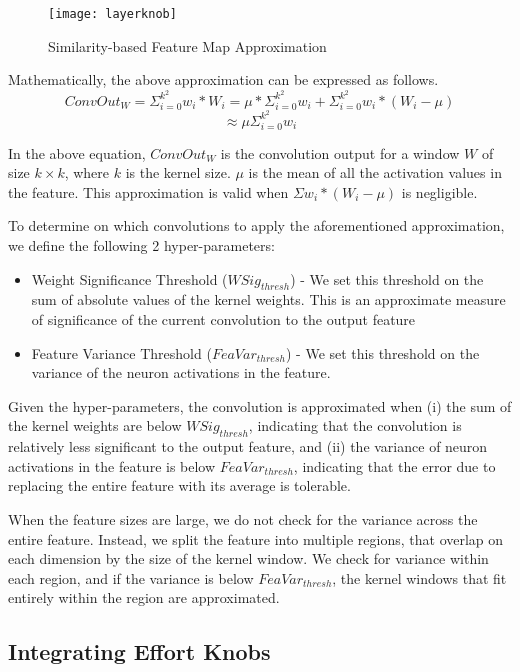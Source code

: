 \documentclass{article} %
\begin{document}
\begin{figure}[htb]
\begin{center}
\texttt{[image: layerknob]}
\end{center}
\caption{Similarity-based Feature Map Approximation}
\label{fig:layerknob}
\end{figure}

Mathematically, the above approximation can be expressed as follows. 
\[ConvOut_W =  \Sigma_{i=0}^{k^2} w_i * W_i = \mu * \Sigma_{i=0}^{k^2} w_i + \Sigma_{i=0}^{k^2} w_i * (W_i - \mu) \] 
\[ \approx \mu \Sigma_{i=0}^{k^2} w_{i} \]

In the above equation, $ConvOut_W$ is the convolution output for a window $W$ of size $k \times k$, where $k$ is the kernel size. $\mu$ is the mean of all the activation values in the feature. This approximation is valid when $\Sigma w_i * (W_i - \mu)$ is negligible.

To determine on which convolutions to apply the aforementioned approximation, we define the following 2 hyper-parameters:
\begin{itemize}
    \item Weight Significance Threshold ($WSig_{thresh}$) - We set this threshold on the sum of absolute values of the kernel weights. This is an approximate measure of significance of the current convolution to the output feature
    \item Feature Variance Threshold ($FeaVar_{thresh}$) - We set this threshold on the variance of the neuron activations in the feature. 
\end{itemize}
Given the hyper-parameters, the convolution is approximated when (i) the sum of the kernel weights are below $WSig_{thresh}$, indicating that the convolution is relatively less significant to the output feature, and (ii) the variance of neuron activations in the feature is below $FeaVar_{thresh}$, indicating that the error due to replacing the entire feature with its average is tolerable.

When the feature sizes are large, we do not check for the variance across the entire feature. Instead, we split the feature into multiple regions, that overlap on each dimension by the size of the kernel window. We check for variance within each region, and if the variance is below $FeaVar_{thresh}$, the kernel windows that fit entirely within the region are approximated.

\subsection{Integrating Effort Knobs}
\end{document}
